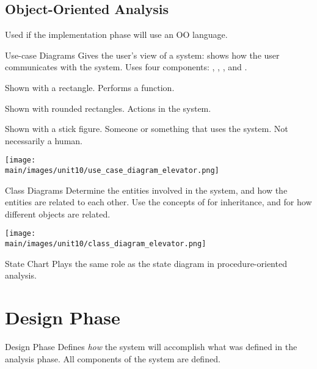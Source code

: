 \documentclass[\main/notes.tex]{subfiles}
\begin{document}
			\subsection{Object-Oriented Analysis}
				Used if the implementation phase will use an OO language.
				\begin{definition}{Use-case Diagrams}
					Gives the user's view of a system: shows how the user communicates with the system. Uses four components: , , , and .
					\begin{indentparagraph}
						\begin{description}[nosep]
							\item[System] Shown with a rectangle. Performs a function.
							\item[Use cases] Shown with rounded rectangles. Actions in the system.
							\item[Actor] Shown with a stick figure. Someone or something that uses the system. Not necessarily a human.
						\end{description}
					\end{indentparagraph}
					\begin{center}
						\texttt{[image: \\main/images/unit10/use\_case\_diagram\_elevator.png]}
					\end{center}
				\end{definition}
				\pagebreak
				\begin{definition}{Class Diagrams}
					Determine the entities involved in the system, and how the entities are related to each other. Use the concepts of  for inheritance, and  for how different objects are related.
					\begin{center}
						\texttt{[image: \\main/images/unit10/class\_diagram\_elevator.png]}
					\end{center}
				\end{definition}
				\begin{definition}{State Chart}
					Plays the same role as the state diagram in procedure-oriented analysis.
				\end{definition}

		\section{Design Phase}
			\begin{definition}{Design Phase}
				Defines \emph{how} the system will accomplish what was defined in the analysis phase. All components of the system are defined.
			\end{definition}
\end{document}
